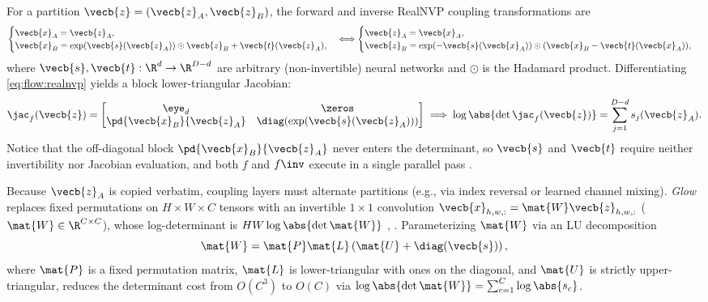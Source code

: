 \documentclass[../../../../master.tex]{subfiles}
\begin{document}
\begin{coremath}
For a partition $\vecb{z} = (\vecb{z}_A, \vecb{z}_B)$, the forward and inverse RealNVP coupling transformations are
\begin{equation}\label{eq:flow:realnvp}
  \begin{cases}
    \vecb{x}_A = \vecb{z}_A, \\
    \vecb{x}_B = \exp(\vecb{s}(\vecb{z}_A)) \odot \vecb{z}_B + \vecb{t}(\vecb{z}_A),
  \end{cases}
  \Longleftrightarrow
  \begin{cases}
    \vecb{z}_A = \vecb{x}_A, \\
    \vecb{z}_B = \exp(-\vecb{s}(\vecb{x}_A)) \odot (\vecb{x}_B - \vecb{t}(\vecb{x}_A)),
  \end{cases}
\end{equation}
where $\vecb{s}, \vecb{t} : \R^d \to \R^{D-d}$ are arbitrary (non-invertible) neural networks and $\odot$ is the Hadamard product. Differentiating \eqref{eq:flow:realnvp} yields a block lower-triangular Jacobian:
\begin{equation}\label{eq:flow:realnvp_jac}
  \jac_f(\vecb{z}) = \begin{bmatrix} \eye_d & \zeros \\ \pd{\vecb{x}_B}{\vecb{z}_A} & \diag\!\left(\exp(\vecb{s}(\vecb{z}_A))\right) \end{bmatrix} \implies \log \abs{\det \jac_f(\vecb{z})} = \sum_{j=1}^{D-d} s_j(\vecb{z}_A).
\end{equation}
Notice that the off-diagonal block $\pd{\vecb{x}_B}{\vecb{z}_A}$ never enters the determinant, so $\vecb{s}$ and $\vecb{t}$ require neither invertibility nor Jacobian evaluation, and both $f$ and $f\inv$ execute in a single parallel pass .

Because $\vecb{z}_A$ is copied verbatim, coupling layers must alternate partitions (e.g., via index reversal or learned channel mixing). \emph{Glow} replaces fixed permutations on $H \times W \times C$ tensors with an invertible $1\times 1$ convolution $\vecb{x}_{h,w,:} = \mat{W}\vecb{z}_{h,w,:}$ ($\mat{W} \in \R^{C \times C}$), whose log-determinant is $HW \log\abs{\det \mat{W}}$ , . Parameterizing $\mat{W}$ via an LU decomposition
\begin{equation}\label{eq:flow:glow_lu}
  \mat{W} = \mat{P}\mat{L}\left(\mat{U} + \diag(\vecb{s})\right),
\end{equation}
where $\mat{P}$ is a fixed permutation matrix, $\mat{L}$ is lower-triangular with ones on the diagonal, and $\mat{U}$ is strictly upper-triangular, reduces the determinant cost from $O(C^3)$ to $O(C)$ via $\log\abs{\det \mat{W}} = \sum_{c=1}^C \log\abs{s_c}$.
\end{coremath}
\end{document}
